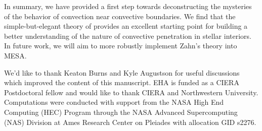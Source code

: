 \documentclass{aastex631}
\begin{document}
In summary, we have provided a first step towards deconstructing the mysteries of the behavior of convection near convective boundaries.
We find that the simple-but-elegant theory of \citet{zahn1991} provides an excellent starting point for building a better understanding of the nature of convective penetration in stellar interiors.
In future work, we will aim to more robustly implement Zahn's theory into MESA.





\begin{acknowledgments}
We'd like to thank Keaton Burns and Kyle Augustson for useful discussions which improved the content of this manuscript.
EHA is funded as a CIERA Postdoctoral fellow and would like to thank CIERA and Northwestern University. 
Computations were conducted with support from the NASA High End Computing (HEC) Program through the NASA Advanced Supercomputing (NAS) Division at Ames Research Center on Pleiades with allocation GID s2276.
\end{acknowledgments}


\appendix
\end{document}
